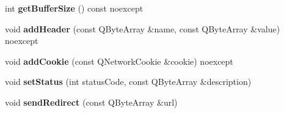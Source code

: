 \begin{DoxyCompactItemize}
\mbox{\label{class_response_a5e68aaad0a2867d7e00168bb158efea4}} 
int {\bfseries get\+Buffer\+Size} () const noexcept
\item 
\mbox{\label{class_response_adae7bde8f1f52edd915e709053b538d5}} 
void {\bfseries add\+Header} (const Q\+Byte\+Array \&name, const Q\+Byte\+Array \&value) noexcept
\item 
\mbox{\label{class_response_a5512fc13abe7abff27529788ba33fe36}} 
void {\bfseries add\+Cookie} (const Q\+Network\+Cookie \&cookie) noexcept
\item 
\mbox{\label{class_response_a2e98562c9c28ba208dc3fc130ff00d77}} 
void {\bfseries set\+Status} (int status\+Code, const Q\+Byte\+Array \&description)
\item 
\mbox{\label{class_response_a7acf6886b6b06704b8bbbb0692948a73}} 
void {\bfseries send\+Redirect} (const Q\+Byte\+Array \&url)
\end{DoxyCompactItemize}
